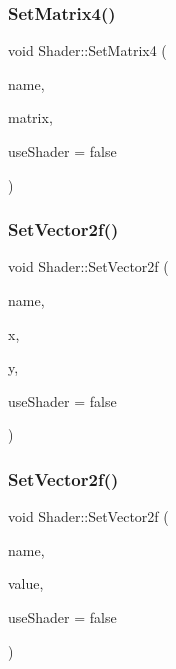 \mbox{\label{class_shader_a0c8e93a639ef45644c1e27043be586b2}} 
\subsubsection{\texorpdfstring{SetMatrix4()}{SetMatrix4()}}
{\footnotesize\ttfamily void Shader\+::\+Set\+Matrix4 (\begin{DoxyParamCaption}\item[{const G\+Lchar $\ast$}]{name,  }\item[{const glm\+::mat4 \&}]{matrix,  }\item[{G\+Lboolean}]{use\+Shader = {\ttfamily false} }\end{DoxyParamCaption})}

\mbox{\label{class_shader_a6f0213e1a40b9ee631f4154da22f6f52}} 
\subsubsection{\texorpdfstring{SetVector2f()}{SetVector2f()}\hspace{0.1cm}{\footnotesize\ttfamily [1/2]}}
{\footnotesize\ttfamily void Shader\+::\+Set\+Vector2f (\begin{DoxyParamCaption}\item[{const G\+Lchar $\ast$}]{name,  }\item[{G\+Lfloat}]{x,  }\item[{G\+Lfloat}]{y,  }\item[{G\+Lboolean}]{use\+Shader = {\ttfamily false} }\end{DoxyParamCaption})}

\mbox{\label{class_shader_ae4c81083a20b2790c15d9fbc8e8c7b38}} 
\subsubsection{\texorpdfstring{SetVector2f()}{SetVector2f()}\hspace{0.1cm}{\footnotesize\ttfamily [2/2]}}
{\footnotesize\ttfamily void Shader\+::\+Set\+Vector2f (\begin{DoxyParamCaption}\item[{const G\+Lchar $\ast$}]{name,  }\item[{const glm\+::vec2 \&}]{value,  }\item[{G\+Lboolean}]{use\+Shader = {\ttfamily false} }\end{DoxyParamCaption})}

